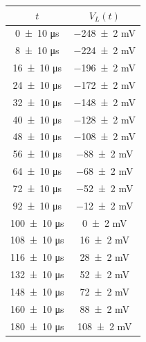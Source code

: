 \documentclass[a4paper]{article}
\begin{document}
\begin{appendices}
\begin{table}[htbp]
    \centering
    \begin{minipage}{0.48\textwidth} %
        \centering\small
        \begin{tabular}{|c|c|}
        \hline
        \( t \) & \( V_L(t) \) \\ %
        \hline\hline
        \num{0   \pm 10} \si{\micro\second} & \num{-248 \pm 2} \si{\milli\volt} \\
        \num{8   \pm 10} \si{\micro\second} & \num{-224 \pm 2} \si{\milli\volt} \\
        \num{16  \pm 10} \si{\micro\second} & \num{-196 \pm 2} \si{\milli\volt} \\
        \num{24  \pm 10} \si{\micro\second} & \num{-172 \pm 2} \si{\milli\volt} \\
        \num{32  \pm 10} \si{\micro\second} & \num{-148 \pm 2} \si{\milli\volt} \\
        \num{40  \pm 10} \si{\micro\second} & \num{-128 \pm 2} \si{\milli\volt} \\
        \num{48  \pm 10} \si{\micro\second} & \num{-108 \pm 2} \si{\milli\volt} \\
        \num{56  \pm 10} \si{\micro\second} & \num{-88  \pm 2} \si{\milli\volt} \\
        \num{64  \pm 10} \si{\micro\second} & \num{-68  \pm 2} \si{\milli\volt} \\
        \num{72  \pm 10} \si{\micro\second} & \num{-52  \pm 2} \si{\milli\volt} \\
        \num{92  \pm 10} \si{\micro\second} & \num{-12  \pm 2} \si{\milli\volt} \\
        \num{100 \pm 10} \si{\micro\second} & \num{0    \pm 2} \si{\milli\volt} \\
        \num{108 \pm 10} \si{\micro\second} & \num{16   \pm 2} \si{\milli\volt} \\
        \num{116 \pm 10} \si{\micro\second} & \num{28   \pm 2} \si{\milli\volt} \\
        \num{132 \pm 10} \si{\micro\second} & \num{52   \pm 2} \si{\milli\volt} \\
        \num{148 \pm 10} \si{\micro\second} & \num{72   \pm 2} \si{\milli\volt} \\
        \num{160 \pm 10} \si{\micro\second} & \num{88   \pm 2} \si{\milli\volt} \\
        \num{180 \pm 10} \si{\micro\second} & \num{108  \pm 2} \si{\milli\volt} \\

\end{tabular}
\end{minipage}
\end{table}
\end{appendices}
\end{document}
